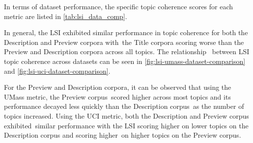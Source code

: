 \documentclass[letterpaper,12pt]{article}
\begin{document}
In terms of dataset performance, the specific topic coherence scores for each metric are listed in \ref{tab:lsi_data_comp}.

In general, the LSI exhibited similar performance in topic coherence for both the Description and Preview corpora with\
the Title corpora scoring worse than the Preview and Description corpora across all topics. The relationship \
between LSI topic coherence across datasets can be seen in \ref{fig:lsi-umass-dataset-comparison} and \ref{fig:lsi-uci-dataset-comparison}.

For the Preview and Description corpora, it can be observed that using the UMass metric, the Preview corpus\
scored higher across most topics and its performance decayed less quickly than the Description corpus\
as the number of topics increased. Using the UCI metric, both the Description and Preview corpus exhibited\
similar performance with the LSI scoring higher on lower topics on the Description corpus and scoring higher\
on higher topics on the Preview corpus. 
\end{document}
